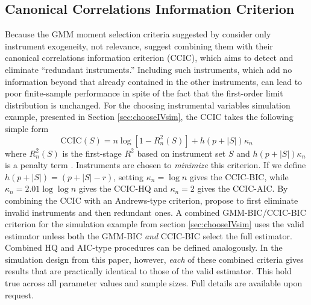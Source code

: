 \subsection{Canonical Correlations Information Criterion}
\label{sec:CCIC}
Because the GMM moment selection criteria suggested by \cite{Andrews1999} consider only instrument exogeneity, not relevance, \cite{HallPeixe2003} suggest combining them with their canonical correlations information criterion (CCIC), which aims to detect and eliminate ``redundant instruments.''
Including such instruments, which add no information beyond that already contained in the other instruments, can lead to poor finite-sample performance in spite of the fact that the first-order limit distribution is unchanged.
For the choosing instrumental variables simulation example, presented in Section \ref{sec:chooseIVsim}, the CCIC takes the following simple form
	\begin{equation}
	\mbox{CCIC}(S) = n \log\left[1 - R_n^2(S) \right] + h(p + |S|)\kappa_n
	\end{equation}
where $R_n^2(S)$ is the first-stage $R^2$ based on instrument set $S$ and $h(p + |S|)\kappa_n$ is a penalty term \citep{Jana2005}. 
Instruments are chosen to \emph{minimize} this criterion.
If we define $h(p + |S|) = (p + |S| - r)$, setting $\kappa_n = \log{n}$ gives the CCIC-BIC, while $\kappa_n = 2.01 \log{\log{n}}$ gives the CCIC-HQ and $\kappa_n = 2$ gives the CCIC-AIC.
By combining the CCIC with an Andrews-type criterion, \cite{HallPeixe2003} propose to first eliminate invalid instruments and then redundant ones.
A combined GMM-BIC/CCIC-BIC criterion for the simulation example from section \ref{sec:chooseIVsim} uses the valid estimator unless both the GMM-BIC \emph{and} CCIC-BIC select the full estimator.
Combined HQ and AIC-type procedures can be defined analogously.
In the simulation design from this paper, however, \emph{each} of these combined criteria gives results that are practically identical to those of the valid estimator.
This hold true across all parameter values and sample sizes.
Full details are available upon request.

